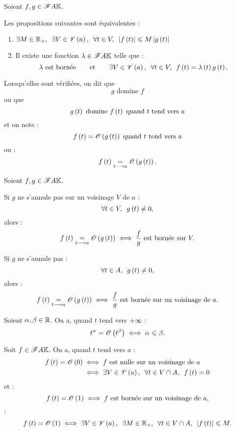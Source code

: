 \begin{defprop}
Soient \(f,g\in\mathscr{F}{A}{\mathbb{K}}\).

Les propositions suivantes sont équivalentes :

\begin{enumerate}
    \item \(\quantifs{\exists M\in\Rp;\exists V\in\V{a};\forall t\in V}\abs{f\paren{t}}\leq M\abs{g\paren{t}}\) \\
    \item Il existe une fonction \(\lambda\in\mathscr{F}{A}{\mathbb{K}}\) telle que : \[\lambda\text{ est bornée}\qquad\text{et}\qquad\quantifs{\exists V\in\V{a};\forall t\in V}f\paren{t}=\lambda\paren{t}g\paren{t}.\]
\end{enumerate}

Lorsqu'elles sont vérifiées, on dit que \[g\text{ domine }f\] ou que \[g\left(t\right)\text{ domine }f\left(t\right)\text{ quand }t\text{ tend vers }a\] et on note : \[f\left(t\right)=\mathscr{O}\left(g\left(t\right)\right)\text{ quand }t\text{ tend vers }a\] ou : \[f\left(t\right)\underset{t\longrightarrow a}{=}\mathscr{O}\left(g\left(t\right)\right).\]
\end{defprop}

\begin{prop}
Soient \(f,g\in\mathscr{F}{A}{\mathbb{K}}\).

Si \(g\) ne s'annule pas sur un voisinage \(V\) de \(a\) : \[\quantifs{\forall t\in V}g\paren{t}\not=0,\] alors : \[f\left(t\right)\underset{t\longrightarrow a}{=}\mathscr{O}\left(g\left(t\right)\right)\iff\dfrac{f}{g}\text{ est bornée sur }V.\]

Si \(g\) ne s'annule pas : \[\quantifs{\forall t\in A}g\paren{t}\not=0,\] alors : \[f\left(t\right)\underset{t\longrightarrow a}{=}\mathscr{O}\left(g\left(t\right)\right)\iff\dfrac{f}{g}\text{ est bornée sur un voisinage de }a.\]
\end{prop}

\begin{ex}
Soient \(\alpha,\beta\in\mathbb{R}\). On a, quand \(t\) tend vers \(+\infty\) : \[t^\alpha=\mathscr{O}\left(t^\beta\right)\iff\alpha\leqslant\beta.\]

Soit \(f\in\mathscr{F}{A}{\mathbb{K}}\). On a, quand \(t\) tend vers \(a\) : \[\begin{aligned}
f\paren{t}=\O{0}&\ssi f\text{ est nulle sur un voisinage de }a \\
&\ssi\quantifs{\exists V\in\V{a};\forall t\in V\inter A}f\paren{t}=0
\end{aligned}\] et : \[f\left(t\right)=\mathscr{O}\left(1\right)\iff f\text{ est bornée sur un voisinage de }a,\] \cad : \[f\paren{t}=\O{1}\ssi\quantifs{\exists V\in\V{a};\exists M\in\Rp;\forall t\in V\inter A}\abs{f\paren{t}}\leq M.\]
\end{ex}

